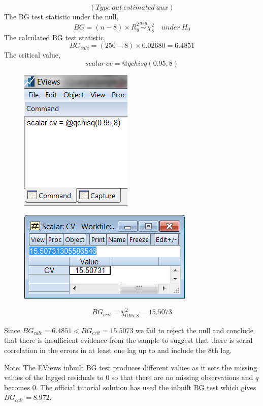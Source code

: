 \documentclass[12pt]{report}
\begin{document}
$$(Type\ out\ estimated\ aux)$$
\noindent The BG test statistic under the null,
$$BG = (n-8)\times R^2_{\hat{u}} \overset{asy}{\sim} \chi^2_8 \quad under\ H_0$$
\noindent The calculated BG test statistic,
$$BG_{calc} = (250-8) \times 0.02680 = 6.4851$$
\noindent The critical value, $$scalar\ cv=@qchisq(0.95,8)$$ \begin{figure}[H]
	\centerline{\includegraphics{tute11_30}}
\end{figure}
\vspace{-\baselineskip} \begin{figure}[H]
	\centerline{\includegraphics{tute11_31}}
\end{figure}
\vspace{-\baselineskip}
$$BG_{crit} = \chi^2_{0.95,8} = 15.5073$$

\noindent Since $BG_{calc} = 6.4851 < BG_{crit} = 15.5073$ we fail to reject the null and conclude that there is insufficient evidence from the sample to suggest that there is serial correlation in the errors in at least one lag up to and include the 8th lag.

\noindent Note: The EViews inbuilt BG test produces different values as it sets the missing values of the lagged residuals to 0 so that there are no missing observations and $q$ becomes 0. The official tutorial solution has used the inbuilt BG test which gives $BG_{calc} = 8.972$.
\end{document}
